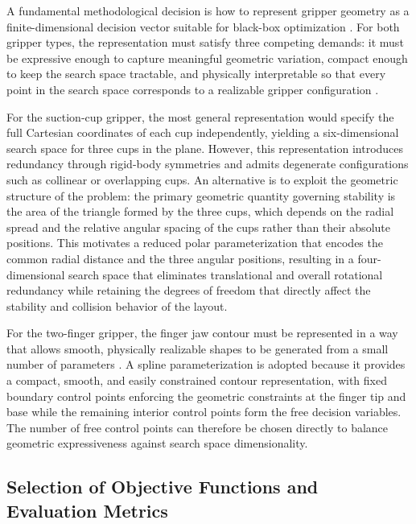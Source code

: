 A fundamental methodological decision is how to represent gripper geometry as a finite-dimensional decision vector suitable for black-box optimization
\cite{Ko2020A} \cite{Todescato}. For both gripper types, the representation must satisfy three competing demands: it must be expressive enough to
capture meaningful geometric variation, compact enough to keep the search space tractable, and physically interpretable so that every point in the
search space corresponds to a realizable gripper configuration \cite{Wang2024Fin-Bayes:}.

For the suction-cup gripper, the most general representation would specify the full Cartesian coordinates of each cup independently, yielding a
six-dimensional search space for three cups in the plane. However, this representation introduces redundancy through rigid-body symmetries and admits
degenerate configurations such as collinear or overlapping cups. An alternative is to exploit the geometric structure of the problem: the primary
geometric quantity governing stability is the area of the triangle formed by the three cups, which depends on the radial spread and the relative
angular spacing of the cups rather than their absolute positions. This motivates a reduced polar parameterization that encodes the common radial
distance and the three angular positions, resulting in a four-dimensional search space that eliminates translational and overall rotational redundancy
while retaining the degrees of freedom that directly affect the stability and collision behavior of the layout.

For the two-finger gripper, the finger jaw contour must be represented in a way that allows smooth, physically realizable shapes to be generated from
a small number of parameters \cite{Wolniakowski2017Task}. A spline parameterization is adopted because it provides a compact, smooth, and easily
constrained contour representation, with fixed boundary control points enforcing the geometric constraints at the finger tip and base while the
remaining interior control points form the free decision variables. The number of free control points can therefore be chosen directly to balance
geometric expressiveness against search space dimensionality.

\subsection{Selection of Objective Functions and Evaluation Metrics}
\label{subsec:methodology_objectives}

